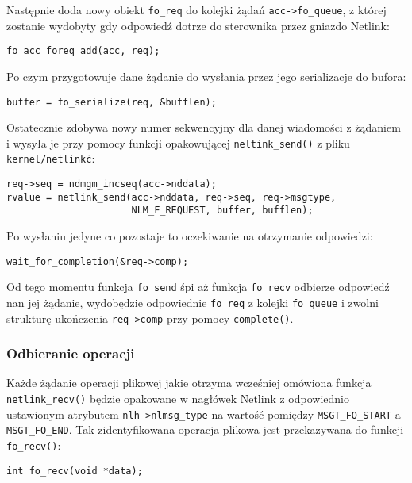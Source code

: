 \documentclass[10pt]{article}
\begin{document}
Następnie doda nowy obiekt \texttt{fo\_req} do kolejki żądań \texttt{acc-\textgreater{}fo\_queue}, z której zostanie wydobyty gdy odpowiedź dotrze do sterownika przez gniazdo Netlink:

\begin{verbatim}
fo_acc_foreq_add(acc, req);
\end{verbatim}

Po czym przygotowuje dane żądanie do wysłania przez jego serializacje do bufora:

\begin{verbatim}
buffer = fo_serialize(req, &bufflen);
\end{verbatim}

Ostatecznie zdobywa nowy numer sekwencyjny dla danej wiadomości z żądaniem i wysyła je przy pomocy funkcji opakowującej \texttt{neltink\_send()} z pliku \texttt{kernel/netlink\.c}:

\begin{verbatim}
req->seq = ndmgm_incseq(acc->nddata);
rvalue = netlink_send(acc->nddata, req->seq, req->msgtype,
                      NLM_F_REQUEST, buffer, bufflen);
\end{verbatim}

Po wysłaniu jedyne co pozostaje to oczekiwanie na otrzymanie odpowiedzi:

\begin{verbatim}
wait_for_completion(&req->comp);
\end{verbatim}

Od tego momentu funkcja \texttt{fo\_send} śpi aż funkcja \texttt{fo\_recv} odbierze odpowiedź nan jej żądanie, wydobędzie odpowiednie \texttt{fo\_req} z kolejki \texttt{fo\_queue} i zwolni strukturę ukończenia \texttt{req-\textgreater{}comp} przy pomocy \texttt{complete()}.

\subsubsection{Odbieranie operacji}
\label{forecv}

Każde żądanie operacji plikowej jakie otrzyma wcześniej omówiona funkcja \texttt{netlink\_recv()} będzie opakowane w nagłówek Netlink z odpowiednio ustawionym atrybutem \texttt{nlh-\textgreater{}nlmsg\_type} na wartość pomiędzy \texttt{MSGT\_FO\_START} a \texttt{MSGT\_FO\_END}.  Tak zidentyfikowana operacja plikowa jest przekazywana do funkcji \texttt{fo\_recv()}:

\begin{verbatim}
int fo_recv(void *data);
\end{verbatim}
\end{document}
